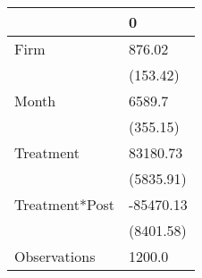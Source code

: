 \begin{tabular}{ll}
\toprule
{} &          0 \\
\midrule
Firm           &     876.02 \\
               &   (153.42) \\
Month          &     6589.7 \\
               &   (355.15) \\
Treatment      &   83180.73 \\
               &  (5835.91) \\
Treatment*Post &  -85470.13 \\
               &  (8401.58) \\
Observations   &     1200.0 \\
\bottomrule
\end{tabular}
